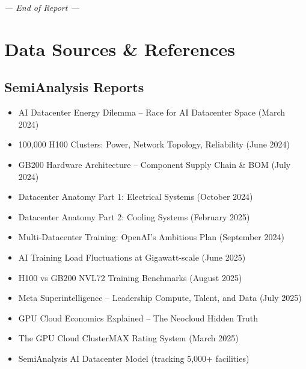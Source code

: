 \documentclass[11pt,a4paper]{article}
\begin{document}
\vspace{2cm}

\begin{center}
\textit{— End of Report —}
\end{center}

\newpage

\appendix
\section{Data Sources \& References}

\subsection*{SemiAnalysis Reports}
\begin{itemize}[leftmargin=*, itemsep=3pt]
    \item AI Datacenter Energy Dilemma – Race for AI Datacenter Space (March 2024)
    \item 100,000 H100 Clusters: Power, Network Topology, Reliability (June 2024)
    \item GB200 Hardware Architecture – Component Supply Chain \& BOM (July 2024)
    \item Datacenter Anatomy Part 1: Electrical Systems (October 2024)
    \item Datacenter Anatomy Part 2: Cooling Systems (February 2025)
    \item Multi-Datacenter Training: OpenAI's Ambitious Plan (September 2024)
    \item AI Training Load Fluctuations at Gigawatt-scale (June 2025)
    \item H100 vs GB200 NVL72 Training Benchmarks (August 2025)
    \item Meta Superintelligence – Leadership Compute, Talent, and Data (July 2025)
    \item GPU Cloud Economics Explained – The Neocloud Hidden Truth
    \item The GPU Cloud ClusterMAX Rating System (March 2025)
    \item SemiAnalysis AI Datacenter Model (tracking 5,000+ facilities)
\end{itemize}
\end{document}
